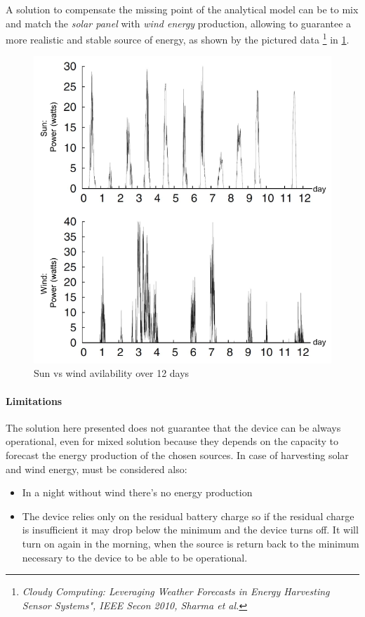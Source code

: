 \documentclass[10pt,a4paper]{report}
\theoremstyle{definition}
\begin{document}
A solution to compensate the missing point of the analytical model can be to mix and match the \textit{solar panel} with \textit{wind energy} production, allowing to guarantee a more realistic and stable source of energy, as shown by the pictured data \footnote{\textit{Cloudy Computing: Leveraging Weather Forecasts in Energy Harvesting Sensor Systems", IEEE Secon 2010, Sharma et al.}} in \ref{mix-match-sources}.
\begin{figure}[h!]
	\centering\includegraphics[scale=0.30]{images/Pasted image 20230506084308.png}
	\caption{Sun vs wind avilability over 12 days}
	\label{mix-match-sources}
\end{figure}

\paragraph{Limitations}\label{sec:limitations}
The solution here presented does not guarantee that the device can be always operational, even for mixed solution because they depends on the capacity to forecast the energy production of the chosen sources. In case of harvesting solar and wind energy, must be considered also:
\begin{itemize}
	\item 
	In a night without wind there’s no energy production
	\item 
	The device relies only on the residual battery charge so if the residual charge is insufficient it may drop below the minimum and the device turns off. It will turn on again in the morning, when the source is return back to the minimum necessary to the device to be able to be operational.
\end{itemize}
\end{document}
